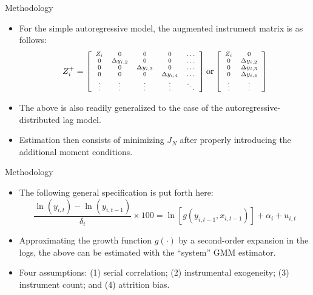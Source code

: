 \documentclass[xcolor=dvipsnames]{beamer}
\begin{document}
\begin{frame}{Methodology}
\begin{itemize}
\item For the simple autoregressive model, the augmented instrument matrix is 
as follows:
\begin{equation*}
Z_{i}^{+} = \left[ 
\scriptsize
\begin{array}{ccccccc}
Z_i  & 0 & 0 & 0 & \ldots \\
0 & \Delta y_{i,2} & 0 & 0 & \ldots \\
0 & 0 & \Delta y_{i,3} & 0 & \ldots  \\
0 & 0 & 0 & \Delta y_{i,4} & \ldots  \\
\vdots & \vdots & \vdots & \vdots & \ddots
\end{array}
\right] \text{or}
\left[ 
\scriptsize
\begin{array}{ccccccc}
Z_i  & 0  \\
0 & \Delta y_{i,2}  \\
0 & \Delta y_{i,3}  \\
0 & \Delta y_{i,4}  \\
\vdots & \vdots 
\end{array}
\right]
\end{equation*}
\par\pause\noindent \item The above is also readily generalized to the 
case of the autoregressive-distributed lag model.
\par\pause\noindent \item Estimation then consists of minimizing 
$J_N$ after properly introducing the additional moment conditions. 
\end{itemize}
\end{frame}

\begin{frame}{Methodology}
\begin{itemize}
\item The following general specification is put forth here:
\begin{equation*}
\frac{\ln(y_{i,t}) - \ln(y_{i,t-1})}{\delta_t} \times 100 =  
\ln [g(y_{i,t-1}, x_{i,t-1})]+ \alpha_i  + u_{i,t}
\end{equation*}
\par\pause\noindent \item Approximating the growth function $g(\cdot)$ 
by a second-order expansion in the logs, the above can be estimated with the 
``system'' GMM estimator.
\par\pause\noindent \item Four assumptions: (1) serial correlation; (2) 
instrumental exogeneity; (3) instrument count; and (4) attrition bias. 
\end{itemize}
\end{frame}
\end{document}
